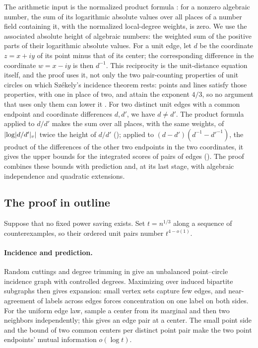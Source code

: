 The arithmetic input is the normalized product formula
\cite{ProductFormula}: for a nonzero algebraic number, the sum of its
logarithmic absolute values over all places of a number field containing
it, with the normalized local-degree weights, is zero. We use the associated
absolute height of algebraic numbers: the weighted sum of the positive
parts of their logarithmic absolute values. For a unit edge, let \(d\)
be the coordinate \(z=x+iy\) of its point minus that of its center; the
corresponding difference in the coordinate \(w=x-iy\) is then
\(d^{-1}\). This reciprocity is the unit-distance equation itself, and the
proof uses it, not only the two pair-counting properties of unit circles on
which Sz\'ekely's incidence theorem rests: points and lines satisfy those
properties, with one in place of two, and attain the exponent \(4/3\), so no
argument that uses only them can lower it
\cite[Section~1.1]{pachRazSolymosi2026}. For two distinct unit edges with a common endpoint and coordinate differences \(d,d'\),
we have \(d\ne d'\). The product formula applied to \(d/d'\) makes
the sum over all places, with the same weights, of
\(\lvert \log\lvert d/d'\rvert_v\rvert\) twice the height of \(d/d'\)
(); applied to \((d-d')(d^{-1}-d'^{-1})\), the product
of the differences of the other two endpoints in the two coordinates, it
gives the upper bounds for the integrated scores of pairs of edges
(). The proof combines these bounds with
prediction and, at its last stage, with algebraic independence and
quadratic extensions.

\subsection{The proof in outline}

Suppose that no fixed power saving exists. Set \(t=n^{1/3}\) along a sequence
of counterexamples, so their ordered unit pairs number \(t^{4-o(1)}\).

\paragraph{Incidence and prediction.}
Random cuttings and degree trimming in  give an
unbalanced point--circle incidence graph with controlled degrees.
Maximizing over induced bipartite subgraphs then gives expansion: small vertex sets
capture few edges, and near-agreement of labels across edges forces
concentration on one label on both sides.
For the uniform edge law, sample a center from its marginal and then
two neighbors independently; this gives an edge pair at a center. The small point
side and the bound of two common centers per distinct point pair make
the two point endpoints' mutual information \(o(\log t)\).

